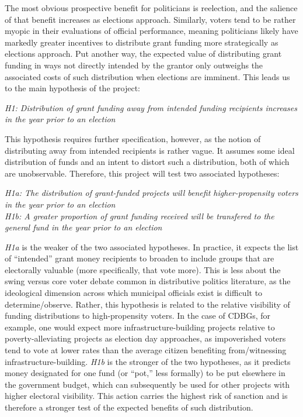 \documentclass[12pt,a4paper]{article}
\begin{document}
\par The most obvious prospective benefit for politicians is reelection, and the salience of that benefit increases as elections approach. Similarly, voters tend to be rather myopic in their evaluations of official performance, meaning politicians likely have markedly greater incentives to distribute grant funding more strategically as elections approach. Put another way, the expected value of distributing grant funding in ways not directly intended by the grantor only outweighs the associated costs of such distribution when elections are imminent. This leads us to the main hypothesis of the project:

\begin{center}
	\textit{H1: Distribution of grant funding away from intended funding recipients increases in the year prior to an election}	
\end{center}

\par This hypothesis requires further specification, however, as the notion of distributing away from intended recipients is rather vague. It assumes some ideal distribution of funds and an intent to distort such a distribution, both of which are unobservable. Therefore, this project will test two associated hypotheses:

\begin{center}
	\textit{H1a: The distribution of grant-funded projects will benefit higher-propensity voters in the year prior to an election}\\
	\textit{H1b: A greater proportion of grant funding received will be transfered to the general fund in the year prior to an election}\\	
\end{center}

\par \textit{H1a} is the weaker of the two associated hypotheses. In practice, it expects the list of ``intended'' grant money recipients to broaden to include groups that are electorally valuable (more specifically, that vote more). This is less about the swing versus core voter debate common in distributive politics literature, as the ideological dimension across which municipal officials exist is difficult to determine/observe. Rather, this hypothesis is related to the relative visibility of funding distributions to high-propensity voters. In the case of CDBGs, for example, one would expect more infrastructure-building projects relative to poverty-alleviating projects as election day approaches, as impoverished voters tend to vote at lower rates than the average citizen benefiting from/witnessing infrastructure-building. \textit{H1b} is the stronger of the two hypotheses, as it predicts money designated for one fund (or ``pot,'' less formally) to be put elsewhere in the government budget, which can subsequently be used for other projects with higher electoral visibility. This action carries the highest risk of sanction and is therefore a stronger test of the expected benefits of such distribution.
\end{document}
